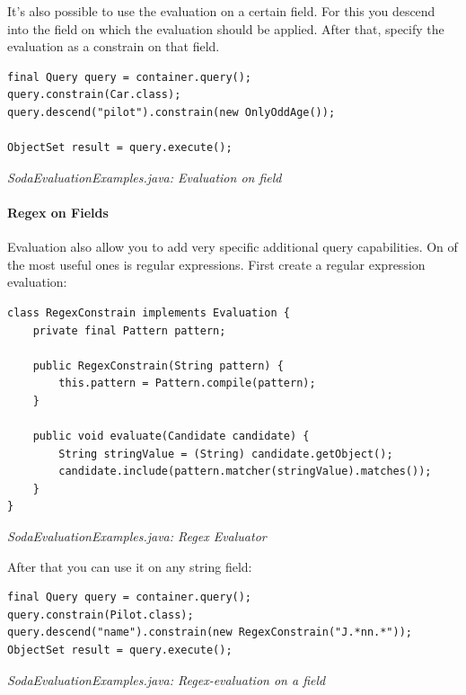It's also possible to use the evaluation on a certain field. For this you descend into the field on which the evaluation should be applied. After that, specify the evaluation as a constrain on that field.

\begin{lstlisting}
final Query query = container.query();
query.constrain(Car.class);
query.descend("pilot").constrain(new OnlyOddAge());

ObjectSet result = query.execute();
\end{lstlisting}

{\small\itshape SodaEvaluationExamples.java: Evaluation on field\par}
\medskip

\paragraph{Regex on Fields}
\label{ref:basics-querying-soda-soda-evaluations:regexevaluation}

Evaluation also allow you to add very specific additional query capabilities. On of the most useful ones is regular expressions. First create a regular expression evaluation:

\begin{lstlisting}
class RegexConstrain implements Evaluation {
    private final Pattern pattern;

    public RegexConstrain(String pattern) {
        this.pattern = Pattern.compile(pattern);
    }

    public void evaluate(Candidate candidate) {
        String stringValue = (String) candidate.getObject();
        candidate.include(pattern.matcher(stringValue).matches());
    }
}
\end{lstlisting}

{\small\itshape SodaEvaluationExamples.java: Regex Evaluator\par}
\medskip

After that you can use it on any string field:

\begin{lstlisting}
final Query query = container.query();
query.constrain(Pilot.class);
query.descend("name").constrain(new RegexConstrain("J.*nn.*"));
ObjectSet result = query.execute();
\end{lstlisting}

{\small\itshape SodaEvaluationExamples.java: Regex-evaluation on a field\par}
\medskip

